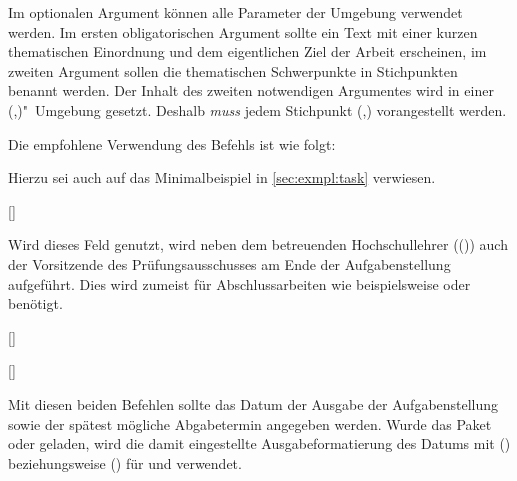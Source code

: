 \begin{DeclareEntity}{}
\begin{Declaration}
Im optionalen Argument können alle Parameter der Umgebung  
verwendet werden. Im ersten obligatorischen Argument sollte ein Text mit einer 
kurzen thematischen Einordnung und dem eigentlichen Ziel der Arbeit erscheinen, 
im zweiten Argument sollen die thematischen Schwerpunkte in Stichpunkten 
benannt werden. Der Inhalt des zweiten notwendigen Argumentes wird in einer 
(,)"~Umgebung
gesetzt. Deshalb \emph{muss} jedem Stichpunkt 
(,) vorangestellt 
werden.
\end{Declaration}
%
\begin{Example}
Die empfohlene Verwendung des Befehls  ist wie folgt:
\begin{Code}
\end{Code}
Hierzu sei auch auf das Minimalbeispiel in \autoref{sec:exmpl:task} verwiesen.%
%
\end{Example}

\begin{Declaration}
  {[]}
\printdeclarationlist

Wird dieses Feld genutzt, wird neben dem betreuenden Hochschullehrer 
(()) auch der Vorsitzende des Prüfungsausschusses am Ende der 
Aufgabenstellung aufgeführt. Dies wird zumeist für Abschlussarbeiten wie 
beispielsweise \masterthesisname{} oder \diplomathesisname{} benötigt.
\end{Declaration}

\begin{Declaration}
  {[]}
\begin{Declaration}
  {[]}
\printdeclarationlist

Mit diesen beiden Befehlen sollte das Datum der Ausgabe der Aufgabenstellung 
sowie der spätest mögliche Abgabetermin angegeben werden. Wurde das Paket 
 oder  geladen, wird die damit eingestellte 
Ausgabeformatierung des Datums mit () 
beziehungsweise () für  und 
 verwendet.
\end{Declaration}
\end{Declaration}




\end{DeclareEntity}
